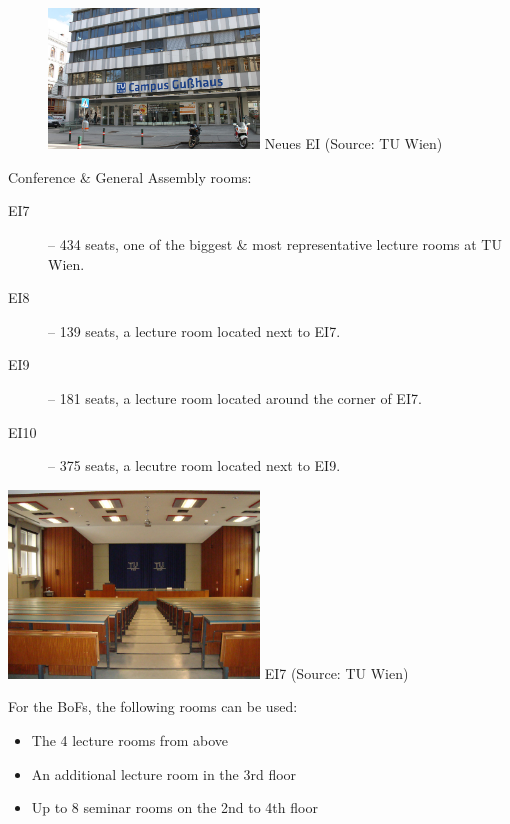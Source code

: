 \documentclass[10pt,a4paper]{article}
\begin{document}
\begin{figure}
\vspace{-22pt}
\begin{center}
\includegraphics[width=0.5\textwidth]{neues_ei_tuwien.jpg}
\footnotesize{Neues EI (Source: TU Wien)}
\end{center}
\vspace{-16pt}
\end{figure}

Conference \& General Assembly rooms:
\begin{description}
\item[\color{kdedarker} EI7] -- 434 seats, one of the biggest \& most representative lecture rooms at TU Wien.
\item[\color{kdedarker} EI8] -- 139 seats, a lecture room located next to EI7.
\item[\color{kdedarker} EI9] -- 181 seats, a lecture room located around the corner of EI7.
\item[\color{kdedarker} EI10]-- 375 seats, a lecutre room located next to EI9.
\end{description}

\vspace{10pt}
\begin{center}
	\includegraphics[width=0.5\textwidth]{EI7_tuwien.jpg}
	\footnotesize{EI7 (Source: TU Wien)}
\end{center}
\vspace{10pt}

For the BoFs, the following rooms can be used:\\
\begin{itemize}
	\item The 4 lecture rooms from above
	\item An additional lecture room in the 3rd floor
	\item Up to 8 seminar rooms on the 2nd to 4th floor
\end{itemize}
\end{document}

